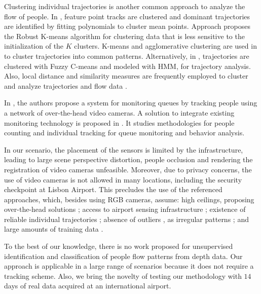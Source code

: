%
Clustering individual trajectories is another common approach to analyze the flow of people.
In \cite{cheriyadat2008detecting}, feature point tracks are clustered and dominant trajectories are identified by fitting polynomials to cluster mean points.
Approach \cite{lei2016robust} proposes the Robust K-means algorithm for clustering data that is less sensitive to the initialization of the $K$ clusters.
K-means and agglomerative clustering are used in \cite{kalayeh2015understanding} to cluster trajectories into common patterns. 
Alternatively, in \cite{morris2008learning}, trajectories are clustered with Fuzzy C-means and modeled with HMM, for trajectory analysis. Also, local distance and similarity measures are frequently employed to cluster and analyze trajectories and flow data \cite{liao2005clustering, hou2016repeatability}.

%
In \cite{wu2011real}, the authors propose a system for monitoring queues by tracking people using a network of over-the-head video cameras. 
A solution to integrate existing monitoring technology is proposed in \cite{denman2015automatic}. It studies methodologies for people counting and individual tracking for queue monitoring and behavior analysis. 

In our scenario, the placement of the sensors is limited by the infrastructure, leading to large scene perspective distortion, people occlusion and rendering the registration of video cameras unfeasible. 
Moreover, due to privacy concerns, the use of video cameras is not allowed in many locations, including the security checkpoint at Lisbon Airport.
This precludes the use of the referenced approaches, which, besides using RGB cameras, assume: high ceilings, proposing over-the-head solutions \cite{gao2016people, del2015versatile,wu2011real}; access to airport sensing infrastructure \cite{denman2015automatic}; existence of reliable individual trajectories \cite{cheriyadat2008detecting,kalayeh2015understanding,morris2008learning, candamo2010understanding}; absence of outliers%
, as irregular patterns \cite{lei2016robust}; and large amounts of training data \cite{zhang2015cross, zhang2016single, zhao2016crossing}.

To the best of our knowledge, there is no work proposed for unsupervised identification and classification of people flow patterns from depth data.
Our approach is applicable in a large range of scenarios because it does not require a tracking scheme.
Also, we bring the novelty of testing our methodology with $14$ days of real data acquired at an international airport.

